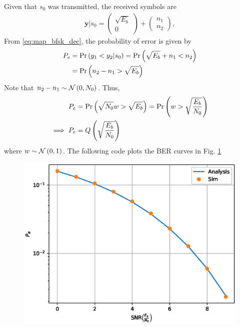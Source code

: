 \documentclass[10pt, a4paper]{article}
\begin{document}
\begin{enumerate}
\solution Given that $s_0$ was transmitted, the received symbols are
\begin{align}
\mathbf{y}|s_0 = 
\begin{pmatrix}
\sqrt{E_b} \\
0
\end{pmatrix}
+
\begin{pmatrix}
 n_{1}\\
n_{2}
\end{pmatrix},
\end{align}
From \eqref{eq:map_bfsk_dec}, 
the probability of error is given by
\begin{align}
P_e &= \Pr\left(y_1 < y_2|s_0\right) = \Pr\left(\sqrt{E_b} + n_1 < n_2\right)
\\
&= \Pr\left( n_2-n_1 > \sqrt{E_b} \right) 
\label{eq:bfsk_proof_n0}
\end{align}
Note that $n_2-n_1 \sim \mathcal{N}\left(0,N_0\right)$. Thus, 
\begin{align}
P_e &= \Pr\left( \sqrt{N_0}w > \sqrt{E_b} \right)  =  \Pr\left( w > \sqrt{\frac{E_b}{N_0}} \right)
\\
\implies 
P_e & = Q\left(\sqrt{\frac{E_b}{N_0}}\right)
\end{align}
where 
$w \sim \mathcal{N}\left(0,1\right)$.  
%
The following code plots the BER curves in Fig. \ref{fig:bfsk_ber}
\begin{center}
\end{center}


\begin{figure}[!h]
\centering
\includegraphics[width=\columnwidth]{bfsk_ber.eps}
\caption{}
\label{fig:bfsk_ber}
\end{figure}


\end{enumerate}
\end{document}
